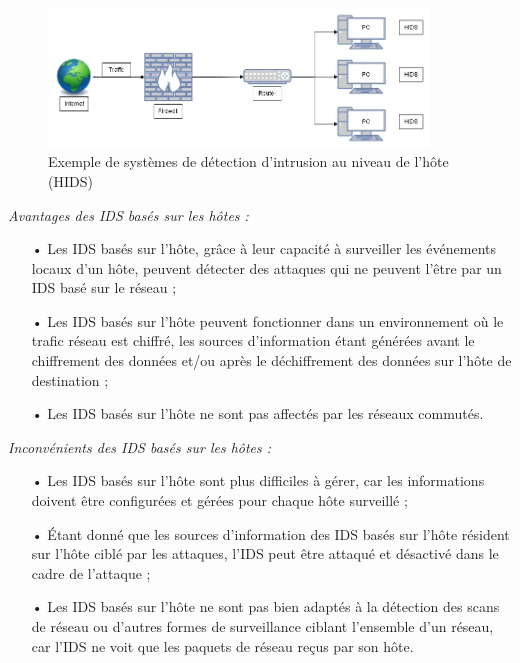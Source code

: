 \begin{figure}[h]%
    \center%
    \includegraphics[width=0.9\textwidth]{assets/HIDS.png}
    \caption[Exemple de systèmes de détection d'intrusion au niveau de l'hôte (HIDS) (source: \href{https://miro.medium.com/v2/resize:fit:4800/format:webp/1*Jbw1iMzBztCaUokJnqePBg.png}{techno-skills.com})]{Exemple de systèmes de détection d'intrusion au niveau de l'hôte (HIDS)}\label{fig:HIDSexemple}
\end{figure}

\vspace{1em}

\textit{Avantages des IDS basés sur les hôtes :}\\

\begin{itemize}[itemsep=1em]
    \item[•] Les IDS basés sur l'hôte, grâce à leur capacité à surveiller les événements locaux d'un hôte, peuvent détecter des attaques qui ne peuvent l'être par un IDS basé sur le réseau ;

\newpage

    \item[•] Les IDS basés sur l'hôte peuvent fonctionner dans un environnement où le trafic réseau est chiffré, les sources d'information étant générées avant le chiffrement des données et/ou après le déchiffrement des données sur l'hôte de destination ;
    \item[•] Les IDS basés sur l'hôte ne sont pas affectés par les réseaux commutés.\\
\end{itemize}

\vspace{1em}

\textit{Inconvénients des IDS basés sur les hôtes :}\\
\vspace{0.5em}
\begin{itemize}[itemsep=1em]
    \item[•] Les IDS basés sur l'hôte sont plus difficiles à gérer, car les informations doivent être configurées et gérées pour chaque hôte surveillé ;
    \item[•] Étant donné que les sources d'information des IDS basés sur l'hôte résident sur l'hôte ciblé par les attaques, l'IDS peut être attaqué et désactivé dans le cadre de l'attaque ;
    \item[•] Les IDS basés sur l'hôte ne sont pas bien adaptés à la détection des scans de réseau ou d'autres formes de surveillance ciblant l'ensemble d'un réseau, car l'IDS ne voit que les paquets de réseau reçus par son hôte.
\end{itemize}

